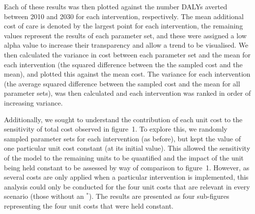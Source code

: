 \documentclass[a4paper]{article}
\begin{document}
Each of these results was then plotted against the number DALYs averted between 2010 and 2030 for each intervention, respectively. The mean additional cost of care is denoted by the largest point for each intervention, the remaining values represent the results of each parameter set, and these were assigned a low alpha value to increase their transparency and allow a trend to be visualised. We then calculated the variance in cost between each parameter set and the mean for each intervention (the squared difference between the the sampled cost and the mean), and plotted this against the mean cost. The variance for each intervention (the average squared difference between the sampled cost and the mean for all parameter sets), was then calculated and each intervention was ranked in order of increasing variance.

Additionally, we sought to understand the contribution of each unit cost to the sensitivity of total cost observed in figure~1. To explore this, we randomly sampled parameter sets for each intervention (as before), but kept the value of one particular unit cost constant (at its initial value). This allowed the sensitivity of the model to the remaining units to be quantified and the impact of the unit being held constant to be assessed by way of comparison to figure~1. However, as several costs are only applied when a particular intervention is implemented, this analysis could only be conducted for the four unit costs that are relevant in every scenario (those without an $^*$). The results are presented as four sub-figures representing the four unit costs that were held constant.
\end{document}
